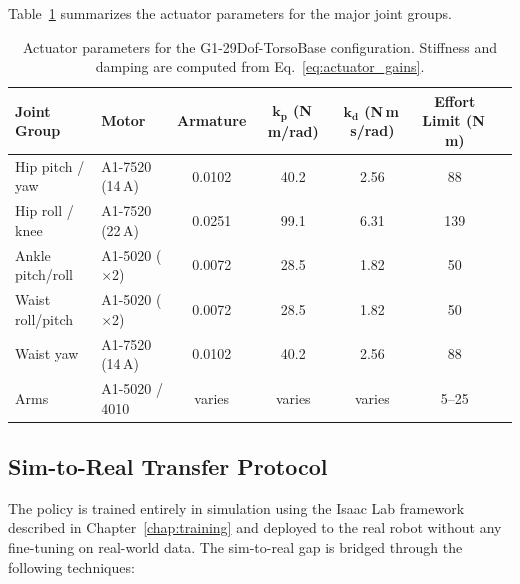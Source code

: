 Table~\ref{tab:actuator_params} summarizes the actuator parameters for the major joint groups.

\begin{table}[t]
\centering
\caption{Actuator parameters for the G1-29Dof-TorsoBase configuration. Stiffness and damping are computed from Eq.~\ref{eq:actuator_gains}.}
\label{tab:actuator_params}
\footnotesize
\begin{tabular}{@{}p{2.5cm}p{2.8cm}ccccc@{}}
\toprule
\textbf{Joint Group} & \textbf{Motor} & \textbf{Armature} & $\boldsymbol{k_p}$ (N\,m/rad) & $\boldsymbol{k_d}$ (N\,m\,s/rad) & \textbf{Effort Limit} (N\,m) \\
\midrule
Hip pitch / yaw   & A1-7520 (14\,A) & 0.0102 & 40.2  & 2.56  & 88  \\
Hip roll / knee   & A1-7520 (22\,A) & 0.0251 & 99.1  & 6.31  & 139 \\
Ankle pitch/roll  & A1-5020 ($\times$2) & 0.0072 & 28.5  & 1.82  & 50  \\
Waist roll/pitch  & A1-5020 ($\times$2) & 0.0072 & 28.5  & 1.82  & 50  \\
Waist yaw         & A1-7520 (14\,A) & 0.0102 & 40.2  & 2.56  & 88  \\
Arms              & A1-5020 / 4010  & varies & varies & varies & 5--25 \\
\bottomrule
\end{tabular}
\end{table}

\subsection{Sim-to-Real Transfer Protocol}
\label{sec:sim2real_protocol}

The policy is trained entirely in simulation using the Isaac Lab framework described in Chapter~\ref{chap:training} and deployed to the real robot without any fine-tuning on real-world data. The sim-to-real gap is bridged through the following techniques:

